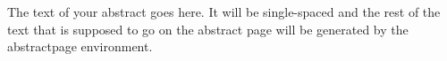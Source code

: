 

The text of your abstract goes here. It will be single-spaced and the rest of the text that
is supposed to go on the abstract page will be generated by the abstractpage environment.